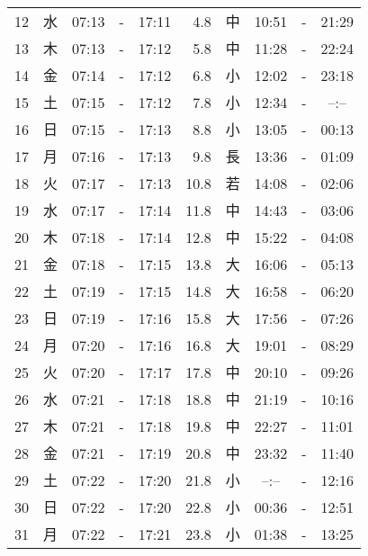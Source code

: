 \documentclass[a4j,10pt]{jsarticle}
\begin{document}
\begin{center}
\begin{table}[ht]
\begin{center}
\begin{tabular}{|rc|ccc|rc|ccc|}
 12 & 水 & 07:13 &-& 17:11 &  4.8 & 中 & 10:51 &-& 21:29 \\
 13 & 木 & 07:13 &-& 17:12 &  5.8 & 中 & 11:28 &-& 22:24 \\
 14 & 金 & 07:14 &-& 17:12 &  6.8 & 小 & 12:02 &-& 23:18 \\
 15 & 土 & 07:15 &-& 17:12 &  7.8 & 小 & 12:34 &-&  --:--  \\
 16 & 日 & 07:15 &-& 17:13 &  8.8 & 小 & 13:05 &-& 00:13 \\
 17 & 月 & 07:16 &-& 17:13 &  9.8 & 長 & 13:36 &-& 01:09 \\
 18 & 火 & 07:17 &-& 17:13 & 10.8 & 若 & 14:08 &-& 02:06 \\
 19 & 水 & 07:17 &-& 17:14 & 11.8 & 中 & 14:43 &-& 03:06 \\
 20 & 木 & 07:18 &-& 17:14 & 12.8 & 中 & 15:22 &-& 04:08 \\
 21 & 金 & 07:18 &-& 17:15 & 13.8 & 大 & 16:06 &-& 05:13 \\
 22 & 土 & 07:19 &-& 17:15 & 14.8 & 大 & 16:58 &-& 06:20 \\
 23 & 日 & 07:19 &-& 17:16 & 15.8 & 大 & 17:56 &-& 07:26 \\
 24 & 月 & 07:20 &-& 17:16 & 16.8 & 大 & 19:01 &-& 08:29 \\
 25 & 火 & 07:20 &-& 17:17 & 17.8 & 中 & 20:10 &-& 09:26 \\
 26 & 水 & 07:21 &-& 17:18 & 18.8 & 中 & 21:19 &-& 10:16 \\
 27 & 木 & 07:21 &-& 17:18 & 19.8 & 中 & 22:27 &-& 11:01 \\
 28 & 金 & 07:21 &-& 17:19 & 20.8 & 中 & 23:32 &-& 11:40 \\
 29 & 土 & 07:22 &-& 17:20 & 21.8 & 小 &  --:--  &-& 12:16 \\
 30 & 日 & 07:22 &-& 17:20 & 22.8 & 小 & 00:36 &-& 12:51 \\
 31 & 月 & 07:22 &-& 17:21 & 23.8 & 小 & 01:38 &-& 13:25 \\
    \hline
    \end{tabular}
    \end{center}
\end{table}
\newpage
\end{center}
\end{document}
